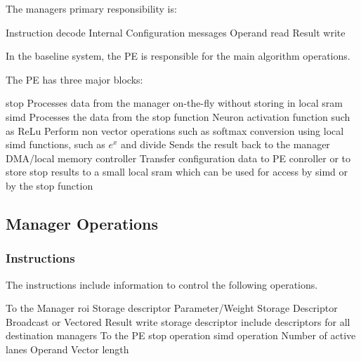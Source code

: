 \documentclass[journal]{IEEEtran}
\begin{document}
The managers primary responsibility is:

\begin{outline}
    \1 Instruction decode
    \1 Internal Configuration messages
    \1 Operand read
    \1 Result write
\end{outline}

In the baseline system, the PE is responsible for the main algorithm operations.

The PE has three major blocks:

\begin{outline}
    \1 \ac{stop} 
      \2 Processes data from the manager on-the-fly without storing in local \ac{sram}
    \1 \ac{simd}
      \2 Processes the data from the \ac{stop} function
        \3 Neuron activation function such as ReLu
        \3 Perform non vector operations such as softmax conversion using local \ac{simd} functions, such as $e^x$ and divide
      \2 Sends the result back to the manager
    \1 DMA/local memory controller
      \2 Transfer configuration data to PE conroller or to store \ac{stop} results to a small local \ac{sram} which can be used for access by \ac{simd} or by the \ac{stop} function
\end{outline}
\subsection{Manager Operations}
\label{sec:Manager Operations}

\subsubsection{Instructions}
\label{ssec:Instructions}
The instructions include information to control the following operations.

\begin{outline}
        \1 To the Manager
            \2 \ac{roi} Storage descriptor
            \2 Parameter/Weight Storage Descriptor
                \3 Broadcast or Vectored
            \2 Result write storage descriptor
                \3 include descriptors for all destination managers
        \1 To the PE
            \2 \ac{stop} operation
            \2 \ac{simd} operation
            \2 Number of active lanes
            \2 Operand Vector length
\end{outline}
\end{document}
